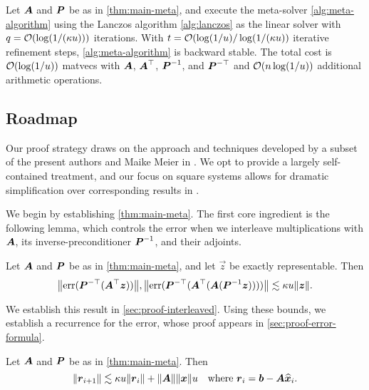\documentclass[onefignum,onetabnum,pagebackref,dvipsnames]{siamart220329}
\begin{document}
\begin{theorem} \label{thm:main-lanczos}
    Let $\boldsymbol{A}$ and $\boldsymbol{P}$ be as in \cref{thm:main-meta}, and execute the meta-solver \cref{alg:meta-algorithm} using the Lanczos algorithm \cref{alg:lanczos} as the linear solver with $q = \mathcal{O}(\log(1/(\kappa u)))$ iterations.
    With $t = \mathcal{O}(\log(1/u) / \log(1/(\kappa u))$ iterative refinement steps, \cref{alg:meta-algorithm} is backward stable.
    The total cost is $\mathcal{O}(\log(1/u))$ matvecs with $\boldsymbol{A}$, $\boldsymbol{A}^\top$, $\boldsymbol{P}^{-1}$, and $\boldsymbol{P}^{-\top}$ and $\mathcal{O}(n\log(1/u))$ additional arithmetic operations.
\end{theorem}

\subsection{Roadmap}
Our proof strategy draws on the approach and techniques developed by a subset of the present authors and Maike Meier in \cite{EMN24}.
We opt to provide a largely self-contained treatment, and our focus on square systems allows for dramatic simplification over corresponding results in \cite{EMN24}.

We begin by establishing \cref{thm:main-meta}.
The first core ingredient is the following lemma, which controls the error when we interleave multiplications with $\boldsymbol{A}$, its inverse-preconditioner $\boldsymbol{P}^{-1}$, and their adjoints.

\begin{lemma} \label{lem:interleaved}
    Let $\boldsymbol{A}$ and $\boldsymbol{P}$ be as in \cref{thm:main-meta}, and let $\vec{z}$ be exactly representable.
    Then
    \begin{equation}
        \bigl\|\err(\mat{P}^{-\top} (\mat{A}^\top \vec{z}))\bigr\|, \bigl\|\err(\mat{P}^{-\top} (\mat{A}^\top (\mat{A}(\mat{P}^{-1}\vec{z}))))\bigr\| \lesssim \kappa u \norm{\vec{z}}. \label{eq:interleaved}
    \end{equation}
\end{lemma}

We establish this result in \cref{sec:proof-interleaved}.
Using these bounds, we establish a recurrence for the error, whose proof appears in \cref{sec:proof-error-formula}.

\begin{lemma} \label{lem:error-formula}
    Let $\boldsymbol{A}$ and $\boldsymbol{P}$ be as in \cref{thm:main-meta}.
    Then
    \begin{equation} \label{eq:r-bound}
        \norm{\vec{r}_{i+1}} \lesssim \kappa u \norm{\vec{r}_i} +\norm{\mat{A}}\norm{\vec{x}}u \quad \text{where $\vec{r}_i = \vec{b} - \mat{A}\vec{\hat{x}}_i$.}
    \end{equation}
\end{lemma}
\end{document}
